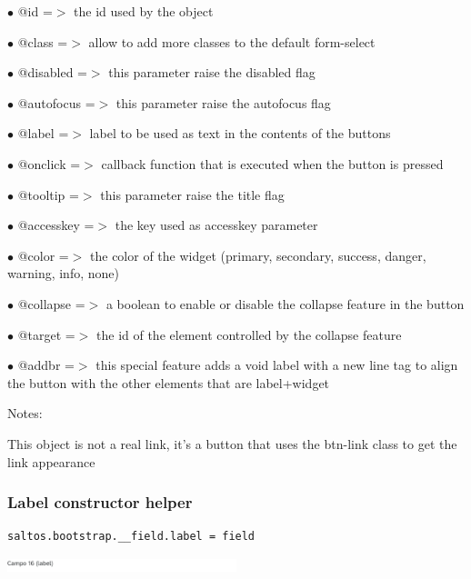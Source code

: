 \documentclass[a4paper]{article}
\begin{document}
\begin{compactitem}
\item[\color{myblue}$\bullet$] @id        =$>$ the id used by the object
\item[\color{myblue}$\bullet$] @class     =$>$ allow to add more classes to the default form-select
\item[\color{myblue}$\bullet$] @disabled  =$>$ this parameter raise the disabled flag
\item[\color{myblue}$\bullet$] @autofocus =$>$ this parameter raise the autofocus flag
\item[\color{myblue}$\bullet$] @label     =$>$ label to be used as text in the contents of the buttons
\item[\color{myblue}$\bullet$] @onclick   =$>$ callback function that is executed when the button is pressed
\item[\color{myblue}$\bullet$] @tooltip   =$>$ this parameter raise the title flag
\item[\color{myblue}$\bullet$] @accesskey =$>$ the key used as accesskey parameter
\item[\color{myblue}$\bullet$] @color     =$>$ the color of the widget (primary, secondary, success, danger, warning, info, none)
\item[\color{myblue}$\bullet$] @collapse  =$>$ a boolean to enable or disable the collapse feature in the button
\item[\color{myblue}$\bullet$] @target    =$>$ the id of the element controlled by the collapse feature
\item[\color{myblue}$\bullet$] @addbr     =$>$ this special feature adds a void label with a new line tag to align the button with
              the other elements that are label+widget
\end{compactitem}

Notes:

This object is not a real link, it's a button that uses the btn-link class to get the link
appearance

\hypertarget{toc71}{}
\subsubsection{Label constructor helper}

\begin{lstlisting}
saltos.bootstrap.__field.label = field
\end{lstlisting}

\begin{center}\includegraphics[width=0.5\textwidth]{../ujest/snaps/test-bootstrap-js-bootstrap-campo-16-label-1-snap.png}\end{center}
\end{document}
